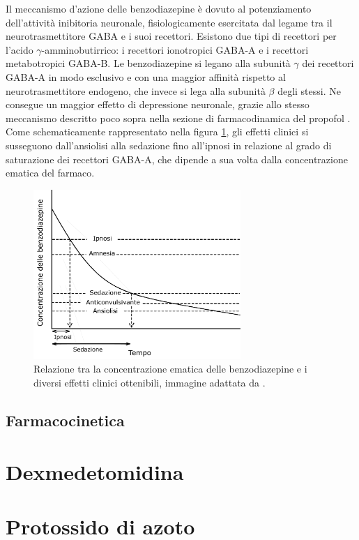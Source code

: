 Il meccanismo d'azione delle benzodiazepine è dovuto al potenziamento dell'attività inibitoria neuronale, fisiologicamente esercitata dal legame tra il neurotrasmettitore GABA e i suoi recettori. Esistono due tipi di recettori per l'acido $\gamma$-amminobutirrico: i recettori ionotropici GABA-A e i recettori metabotropici GABA-B. Le benzodiazepine si legano alla subunità $\gamma$ dei recettori GABA-A in modo esclusivo e con una maggior affinità rispetto al neurotrasmettitore endogeno, che invece si lega alla subunità $\beta$ degli stessi. Ne consegue un maggior effetto di depressione neuronale, grazie allo stesso meccanismo descritto poco sopra nella sezione di farmacodinamica del propofol \cite{Olkkola2008}. 
\\Come schematicamente rappresentato nella figura \ref{fig:benzo}, gli effetti clinici si susseguono dall'ansiolisi alla sedazione fino all'ipnosi in relazione al grado di saturazione dei recettori GABA-A, che dipende a sua volta dalla concentrazione ematica del farmaco. 

\begin{figure}[!h]
    \centering
    \includegraphics[width=0.7\textwidth]{Figure/figurabenzo.pdf}
    \caption{Relazione tra la concentrazione ematica delle benzodiazepine e i diversi effetti clinici ottenibili, immagine adattata da \cite{Olkkola2008}.}
    \label{fig:benzo}
\end{figure}

\subsection{Farmacocinetica}

\section{Dexmedetomidina}

\lipsum[4]

\section{Protossido di azoto}

\lipsum[5]
 